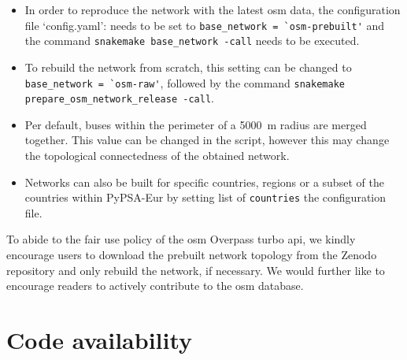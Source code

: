 \documentclass[fleqn,10pt]{wlscirep}
\newcommand{\colorcode}[1]{\colorbox{gray!20}{\lstinline|#1|}}
\providecommand{\DIFdelbegin}{} %
\begin{document}
\begin{itemize}
    \item In order to reproduce the network with the latest \gls{osm} data, the configuration file `config.yaml': needs to be set to \colorcode{base_network = `osm-prebuilt'} and the command \colorcode{snakemake base_network -call} needs to be executed.
    \item To rebuild the network from scratch, this setting can be changed to \colorcode{base_network = `osm-raw'}, followed by the command \colorcode{snakemake prepare_osm_network_release -call}. 
    \item Per default, buses within the perimeter of a \SI{5000}{\meter} radius are merged together. This value can be changed in the script, however this may change the topological connectedness of the obtained network. 
    \item Networks can also be built for specific countries, regions or a subset of the countries within PyPSA-Eur by setting list of \colorcode{countries} the configuration file.
\end{itemize}
To abide to the fair use policy of the \acrshort{osm} Overpass turbo \acrshort{api}, we kindly encourage users to download the prebuilt network topology from the Zenodo repository and only rebuild the network, if necessary. We would further like to encourage readers to actively contribute to the \acrshort{osm} database.


\section*{Code availability}
\DIFdelbegin %
\end{document}

